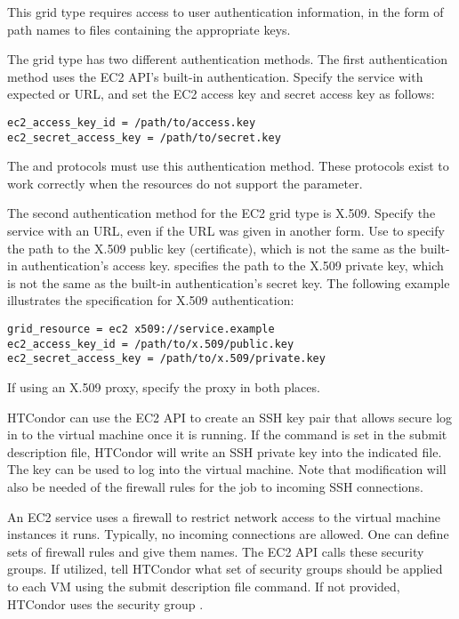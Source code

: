 This grid type requires access to user authentication information,
in the form of path names to files containing the appropriate keys.

The  grid type has two different authentication methods.
The first authentication method uses the EC2 API's built-in authentication.
Specify the service with expected  or  URL,
and set the EC2 access key and secret access key as follows:

\begin{verbatim}
ec2_access_key_id = /path/to/access.key
ec2_secret_access_key = /path/to/secret.key
\end{verbatim}

The  and  protocols must use this 
authentication method.
These protocols exist to work correctly when the resources do not support
the  parameter.

The second authentication method for the EC2 grid type is X.509.
Specify the service with an  URL, 
even if the URL was given in another form.  
Use  to 
specify the path to the X.509 public key (certificate),
which is not the same as the built-in authentication's access key.
 specifies the path to the X.509 
private key,
which is not the same as the built-in authentication's secret key.
The following example illustrates the specification for X.509 authentication:

\begin{verbatim}
grid_resource = ec2 x509://service.example
ec2_access_key_id = /path/to/x.509/public.key
ec2_secret_access_key = /path/to/x.509/private.key
\end{verbatim}

If using an X.509 proxy, specify the proxy in both places.

HTCondor can use the EC2 API to create an SSH key pair that allows
secure log in to the virtual machine once it is running.
If the command
is set in the submit description file,
HTCondor will write an SSH private key into the indicated file.
The key can be used to log into the virtual machine.
Note that modification will also be needed of the firewall
rules for the job to incoming SSH connections.

An EC2 service uses a firewall to restrict network access to 
the virtual machine instances it runs.
Typically, no incoming connections are allowed.
One can define sets of firewall rules and give them names.
The EC2 API calls these security groups. 
If utilized, tell HTCondor what set of security
groups should be applied to each VM using the
 submit description file command.
If not provided, HTCondor uses the security group .

